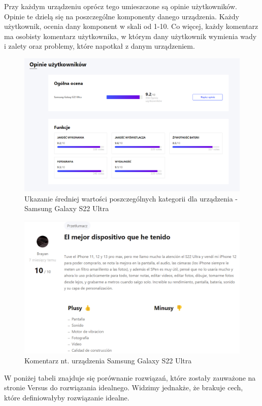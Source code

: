 Przy każdym urządzeniu oprócz tego umieszczone są opinie użytkowników. Opinie te dzielą się na poszczególne komponenty danego urządzenia. Każdy użytkownik, ocenia dany komponent w skali od 1-10.
Co więcej, każdy komentarz ma osobisty komentarz użytkownika, w którym dany użytkownik wymienia wady i zalety oraz problemy, które napotkał z danym urządzeniem.
\begin{figure}[H]
    \centering
    \includegraphics[width=15cm]{img/versus/versusOpinie.png}
    \caption{Ukazanie średniej wartości poszczególnych kategorii dla urządzenia - Samsung Galaxy S22 Ultra}
    \label{versus_3}
\end{figure}
\begin{figure}[H]
    \centering
    \includegraphics[width=15cm]{img/versus/versusKomentarze.png}
    \caption{Komentarz nt. urządzenia Samsung Galaxy S22 Ultra}
    \label{versus_4}
\end{figure}
W poniżej tabeli znajduje się porównanie rozwiązań, które zostały zauważone na stronie Versus do rozwiązania idealnego. Widzimy jednakże, że brakuje cech, które definiowałyby rozwiązanie idealne.
